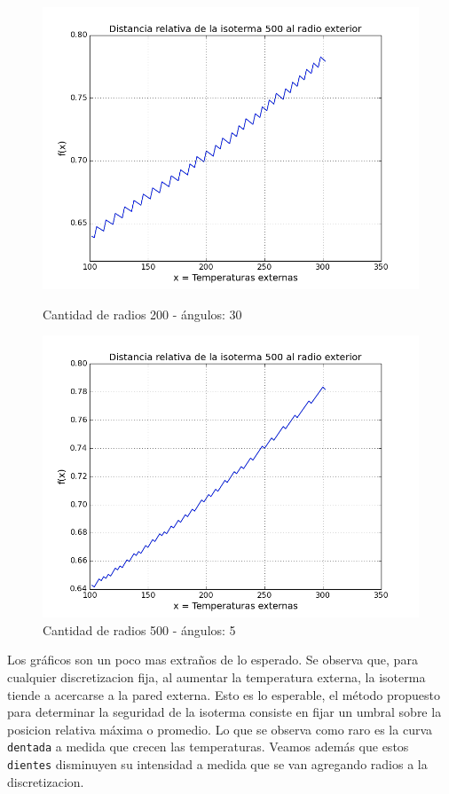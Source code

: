 \begin{figure}[h]
\centering

\includegraphics[scale=0.5]{experimentos1a_1b/evolucion_estimacion_seguridad_isoterma/variacion_30a_200r.png}
\caption{Cantidad de radios 200 - ángulos: 30}

\includegraphics[scale=0.5]{experimentos1a_1b/evolucion_estimacion_seguridad_isoterma/variacion_5a_500r.png}
\caption{Cantidad de radios 500 - ángulos: 5}
\end{figure}

Los gráficos son un poco mas extraños de lo esperado. Se observa que, para cualquier discretizacion fija, al aumentar la temperatura externa, la isoterma tiende a acercarse a la pared externa. Esto es lo esperable, el método propuesto para determinar la seguridad de la isoterma consiste en fijar un umbral sobre la posicion relativa máxima o promedio. Lo que se observa como raro es la curva \texttt{dentada} a medida que crecen las temperaturas. Veamos además que estos \texttt{dientes} disminuyen su intensidad a medida que se van agregando radios a la discretizacion. 


